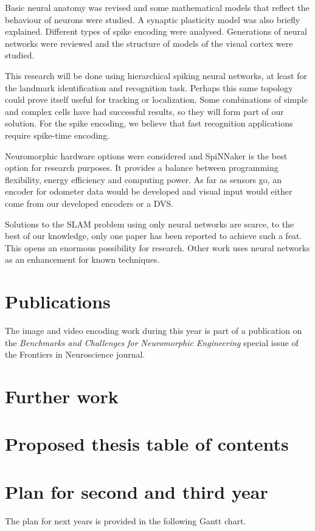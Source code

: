 Basic neural anatomy was revised and some mathematical models that reflect the behaviour of neurons were studied. A synaptic plasticity model was also briefly explained. Different types of spike encoding were analysed. Generations of neural networks were reviewed and the structure of models of the visual cortex were studied. 

This research will be done using hierarchical spiking neural networks, at least for the landmark identification and recognition task. Perhaps this same topology could prove itself useful for tracking or localization. Some combinations of simple and complex cells have had successful results, so they will form part of our solution. For the spike encoding, we believe that fast recognition applications require spike-time encoding.

Neuromorphic hardware options were considered and SpiNNaker is the best option for research purposes. It provides a balance between programming flexibility, energy efficiency and computing power. As far as sensors go, an encoder for odometer data would be developed and visual input would either come from our developed encoders or a DVS.

Solutions to the SLAM problem using only neural networks are scarce, to the best of our knowledge, only one paper has been reported to achieve such a feat. This opens an enormous possibility for research. Other work uses neural networks as an enhancement for known techniques.

\section{Publications}
The image and video encoding work during this year is part of a publication on the \emph{Benchmarks and Challenges for Neuromorphic Engineering} special issue of the Frontiers in Neuroscience journal.

\section{Further work}


\section{Proposed thesis table of contents}


\section{Plan for second and third year}
%
The plan for next years is provided in the following Gantt chart.
\newpage

